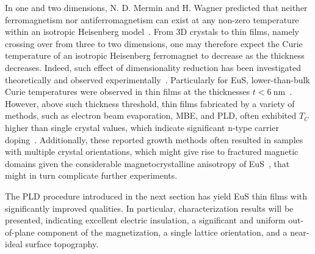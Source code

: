 In one and two dimensions, N. D. Mermin and H. Wagner predicted that neither ferromagnetism nor antiferromagnetism can exist at any non-zero temperature within an isotropic Heisenberg model~\cite{Mermin1966}. From 3D crystals to thin films, namely crossing over from three to two dimensions, one may therefore expect the Curie temperature of an isotropic Heisenberg ferromagnet to decrease as the thickness decreases. Indeed, such effect of dimensionality reduction has been investigated theoretically and observed experimentally~\cite{thickness_Tc_theory, thickness_Tc_exp}. Particularly for EuS, lower-than-bulk Curie temperatures were observed in thin films at the thicknesses $t < 6~\mathrm{nm}$~\cite{EuS_MBE_Muller}. However, above such thickness threshold, thin films fabricated by a variety of methods, such as electron beam evaporation, MBE, and PLD, often exhibited $T_C$ higher than single crystal values, which indicate significant n-type carrier doping~\cite{EuS_MBE_Muller, EuS_thin_film_Keller, EuS_PLD1, EuS_PLD2}. Additionally, these reported growth methods often resulted in samples with multiple crystal orientations, which might give rise to fractured magnetic domains given the considerable magnetocrystalline anisotropy of EuS~\cite{EuS_anisotropy}, that might in turn complicate further experiments.

The PLD procedure introduced in the next section has yield EuS thin films with significantly improved qualities. In particular, characterization results will be presented, indicating excellent electric insulation, a significant and uniform out-of-plane component of the magnetization, a single lattice orientation, and a near-ideal surface topography.

